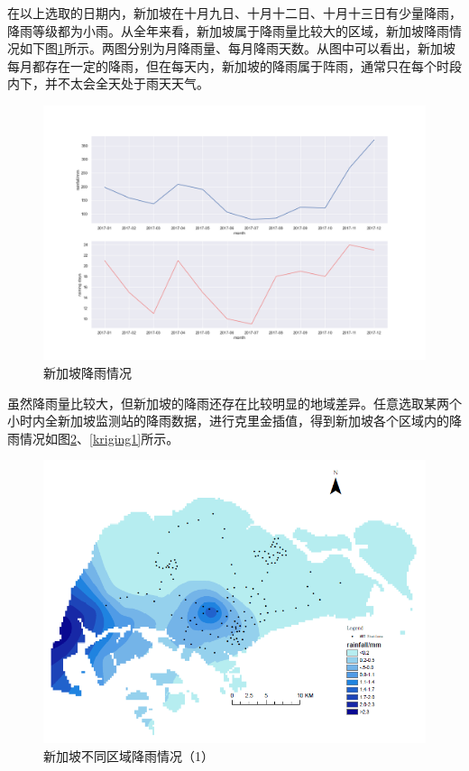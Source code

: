 \documentclass[]{tongjithesis}
\numberwithin{equation}{chapter}
\begin{document}
在以上选取的日期内，新加坡在十月九日、十月十二日、十月十三日有少量降雨，降雨等级都为小雨。从全年来看，新加坡属于降雨量比较大的区域，新加坡降雨情况如下图\ref{rain}所示。两图分别为月降雨量、每月降雨天数。从图中可以看出，新加坡每月都存在一定的降雨，但在每天内，新加坡的降雨属于阵雨，通常只在每个时段内下，并不太会全天处于雨天天气。
\begin{figure}[H]
	\centering
	\includegraphics[width= 0.9 \textwidth]{figures_main/rainfalldays.png}
	\caption{新加坡降雨情况}
	\label{rain}
\end{figure}

虽然降雨量比较大，但新加坡的降雨还存在比较明显的地域差异。任意选取某两个小时内全新加坡监测站的降雨数据，进行克里金插值，得到新加坡各个区域内的降雨情况如图\ref{kriging}、\ref{kriging1}所示。
\begin{figure}[H]
	\centering
	\includegraphics[width= 0.75 \textwidth]{figures_main/kriging.png}
	\caption{新加坡不同区域降雨情况（1）}
	\label{kriging}
\end{figure}
\end{document}
